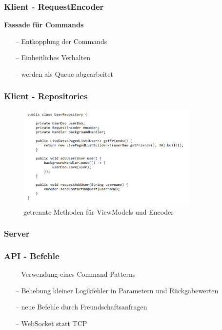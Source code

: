 \documentclass[aspectratio=1610]{beamer}
\begin{document}
	\begin{frame}[plain]
	\frametitle{Klient - RequestEncoder}
	\textbf{Fassade für Commands}
	\begin{itemize}
		\setlength\itemsep{0.3em}
		\item[--] Entkopplung der Commands
		\item[--] Einheitliches Verhalten
		\item[--] werden als Queue abgearbeitet
 	\end{itemize}
	\end{frame}

	\begin{frame}[plain]
	\frametitle{Klient - Repositories}
	\begin{figure}[h]
		\centering
		\includegraphics[width=0.8\textwidth]{images/UserRepository.PNG}
		\caption{getrennte Methoden für ViewModels und Encoder}
	\end{figure}
	\end{frame}

	\begin{frame}[plain]
		\frametitle{Server}

	\end{frame}

	\begin{frame}[plain]
		\frametitle{API - Befehle}
			\begin{itemize}
				\item[--] Verwendung eines Command-Patterns
				\item[--] Behebung kleiner Logikfehler in Parametern und Rückgabewerten
				\item[--] neue Befehle durch Freundschaftsanfragen
				\item[--] WebSocket statt TCP
			\end{itemize}
		\end{frame}
\end{document}

